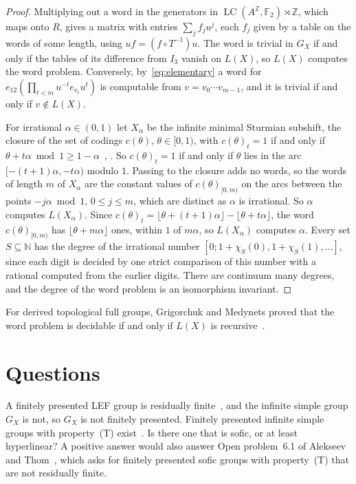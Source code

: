 \documentclass[11pt]{amsart}
\newcommand{\F}{\mathbb F}
\newcommand{\Z}{\mathbb Z}
\newcommand{\LC}{\operatorname{LC}}
\begin{document}
\begin{proof}
Multiplying out a word in the generators in $\LC(A^{\Z},\F_2)\rtimes\Z$,
which maps onto $R$, gives a matrix with entries $\sum_jf_ju^j$, each
$f_j$ given by a table on the words of some length, using
$uf=(f\circ T^{-1})u$. The word is trivial in $G_X$ if and only if the
tables of its difference from $I_3$ vanish on $L(X)$, so $L(X)$ computes
the word problem. Conversely, by~\eqref{eq:elementary} a word for
$e_{12}(\prod_{t<m}u^{-t}e_{v_t}u^t)$ is computable from
$v=v_0\cdots v_{m-1}$, and it is trivial if and only if $v\notin L(X)$.

For irrational $\alpha\in(0,1)$ let $X_\alpha$ be the infinite minimal
Sturmian subshift, the closure of the set of codings $c(\theta)$,
$\theta\in[0,1)$, with $c(\theta)_t=1$ if and only if
$\theta+t\alpha\bmod1\ge1-\alpha$~\cite{MorseHedlund,Hedlund44},
\cite[Chapter~2]{Lothaire}. So $c(\theta)_t=1$ if and only if $\theta$
lies in the arc $[-(t+1)\alpha,-t\alpha)$ modulo $1$. Passing to the
closure adds no words, so the words of length $m$ of $X_\alpha$ are the
constant values of $c(\theta)_{[0,m)}$ on the arcs between the points
$-j\alpha\bmod1$, $0\le j\le m$, which are distinct as $\alpha$ is
irrational. So $\alpha$ computes $L(X_\alpha)$. Since
$c(\theta)_t=\lfloor\theta+(t+1)\alpha\rfloor-\lfloor\theta+t\alpha\rfloor$,
the word $c(\theta)_{[0,m)}$ has $\lfloor\theta+m\alpha\rfloor$ ones,
within $1$ of $m\alpha$, so $L(X_\alpha)$ computes $\alpha$. Every set
$S\subseteq\mathbb N$ has the degree of the irrational number
$[0;1+\chi_S(0),1+\chi_S(1),\dots]$, since each digit is decided by one
strict comparison of this number with a rational computed from the
earlier digits. There are continuum many degrees, and the degree of the
word problem is an isomorphism invariant.
\end{proof}

For derived topological full groups, Grigorchuk and Medynets proved that
the word problem is decidable if and only if $L(X)$ is
recursive~\cite[Theorem~1.1(3)]{GMpres}.

\section{Questions}

A finitely presented LEF group is residually finite~\cite{VershikGordon},
and the infinite simple group $G_X$ is not, so $G_X$ is not finitely
presented. Finitely presented infinite simple groups with
property~\textup{(T)} exist~\cite{CapraceRemy}. Is there one that is
sofic, or at least hyperlinear? A positive answer would also answer Open
problem~6.1 of Alekseev and Thom~\cite{AlekseevThom}, which asks for
finitely presented sofic groups with property~\textup{(T)} that are not
residually finite.
\end{document}
